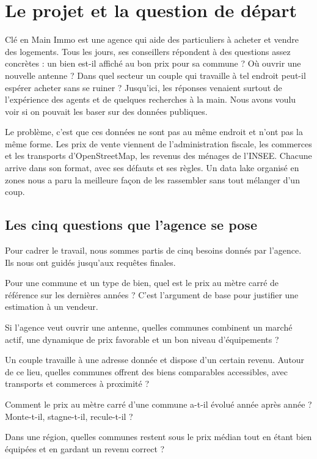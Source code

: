 \documentclass[11pt,a4paper]{article}
\begin{document}
\section{Le projet et la question de départ}

Clé en Main Immo est une agence qui aide des particuliers à acheter et vendre des logements. Tous les jours, ses conseillers répondent à des questions assez concrètes : un bien est-il affiché au bon prix pour sa commune ? Où ouvrir une nouvelle antenne ? Dans quel secteur un couple qui travaille à tel endroit peut-il espérer acheter sans se ruiner ? Jusqu'ici, les réponses venaient surtout de l'expérience des agents et de quelques recherches à la main. Nous avons voulu voir si on pouvait les baser sur des données publiques.

Le problème, c'est que ces données ne sont pas au même endroit et n'ont pas la même forme. Les prix de vente viennent de l'administration fiscale, les commerces et les transports d'OpenStreetMap, les revenus des ménages de l'INSEE. Chacune arrive dans son format, avec ses défauts et ses règles. Un data lake organisé en zones nous a paru la meilleure façon de les rassembler sans tout mélanger d'un coup.

\subsection{Les cinq questions que l'agence se pose}

Pour cadrer le travail, nous sommes partis de cinq besoins donnés par l'agence. Ils nous ont guidés jusqu'aux requêtes finales.

\begin{description}[leftmargin=1.4cm,style=nextline]
  \item[B1 --- Situer un prix.] Pour une commune et un type de bien, quel est le prix au mètre carré de référence sur les dernières années ? C'est l'argument de base pour justifier une estimation à un vendeur.
  \item[B2 --- Choisir où s'implanter.] Si l'agence veut ouvrir une antenne, quelles communes combinent un marché actif, une dynamique de prix favorable et un bon niveau d'équipements ?
  \item[B3 --- Conseiller un couple.] Un couple travaille à une adresse donnée et dispose d'un certain revenu. Autour de ce lieu, quelles communes offrent des biens comparables accessibles, avec transports et commerces à proximité ?
  \item[B4 --- Lire une tendance.] Comment le prix au mètre carré d'une commune a-t-il évolué année après année ? Monte-t-il, stagne-t-il, recule-t-il ?
  \item[B5 --- Repérer les bonnes affaires.] Dans une région, quelles communes restent sous le prix médian tout en étant bien équipées et en gardant un revenu correct ?
\end{description}
\end{document}
